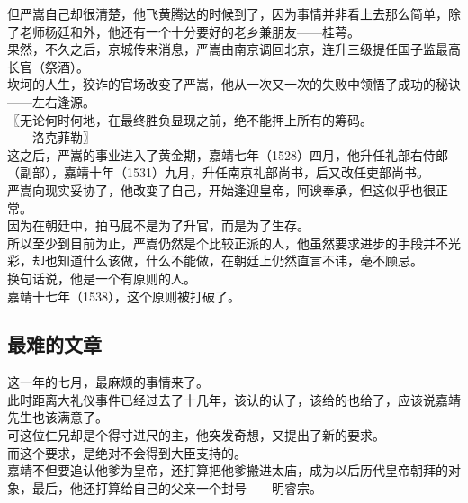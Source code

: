 \begin{multicols}{\theparacolNo}
但严嵩自己却很清楚，他飞黄腾达的时候到了，因为事情并非看上去那么简单，除了老师杨廷和外，他还有一个十分要好的老乡兼朋友——桂萼。\\

果然，不久之后，京城传来消息，严嵩由南京调回北京，连升三级提任国子监最高长官（祭酒）。\\

坎坷的人生，狡诈的官场改变了严嵩，他从一次又一次的失败中领悟了成功的秘诀——左右逢源。\\

〖无论何时何地，在最终胜负显现之前，绝不能押上所有的筹码。\\

——洛克菲勒〗\\

这之后，严嵩的事业进入了黄金期，嘉靖七年（1528）四月，他升任礼部右侍郎（副部），嘉靖十年（1531）九月，升任南京礼部尚书，后又改任吏部尚书。\\

严嵩向现实妥协了，他改变了自己，开始逢迎皇帝，阿谀奉承，但这似乎也很正常。\\

因为在朝廷中，拍马屁不是为了升官，而是为了生存。\\

所以至少到目前为止，严嵩仍然是个比较正派的人，他虽然要求进步的手段并不光彩，却也知道什么该做，什么不能做，在朝廷上仍然直言不讳，毫不顾忌。\\

换句话说，他是一个有原则的人。\\

嘉靖十七年（1538），这个原则被打破了。\\

\subsection{最难的文章}
这一年的七月，最麻烦的事情来了。\\

此时距离大礼仪事件已经过去了十几年，该认的认了，该给的也给了，应该说嘉靖先生也该满意了。\\

可这位仁兄却是个得寸进尺的主，他突发奇想，又提出了新的要求。\\

而这个要求，是绝对不会得到大臣支持的。\\

嘉靖不但要追认他爹为皇帝，还打算把他爹搬进太庙，成为以后历代皇帝朝拜的对象，最后，他还打算给自己的父亲一个封号——明睿宗。\\


\end{multicols}
